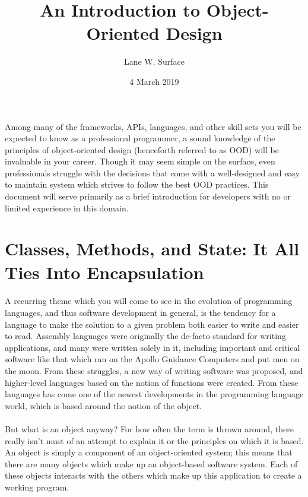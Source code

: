 \documentclass{article}
\title{An Introduction to Object-Oriented Design}
\author{Lane W. Surface}
\date{4 March 2019}
\begin{document}
\maketitle

\newpage
{}
Among many of the frameworks, APIs, languages, and other skill sets you will be
expected to know as a professional programmer, a sound knowledge of the
principles of object-oriented design (henceforth referred to as OOD) will be
invaluable in your career. Though it may seem simple on the surface, even
professionals struggle with the decisions that come with a well-designed and
easy to maintain system which strives to follow the best OOD practices. This
document will serve primarily as a brief introduction for developers with no or
limited experience in this domain.

\section{Classes, Methods, and State: It All Ties Into Encapsulation}
\paragraph{}
A recurring theme which you will come to see in the evolution of programming
languages, and thus software development in general, is the tendency for a
language to make the solution to a given problem both easier to write and easier to read. Assembly languages were originally the de-facto standard for writing
applications, and many were written solely in it, including important and
critical software like that which ran on the Apollo Guidance Computers and put
men on the moon. From these struggles, a new way of writing software was
proposed, and higher-level languages based on the notion of functions were
created. From these languages has come one of the newest developments in the
programming language world, which is based around the notion of the object.
\paragraph{}
But what is an object anyway? For how often the term is thrown around, there
really isn't must of an attempt to explain it or the principles on which it is
based. An object is simply a component of an object-oriented system; this means
that there are many objects which make up an object-based software system. Each
of these objects interacts with the others which make up this application to
create a working program.
\end{document}

